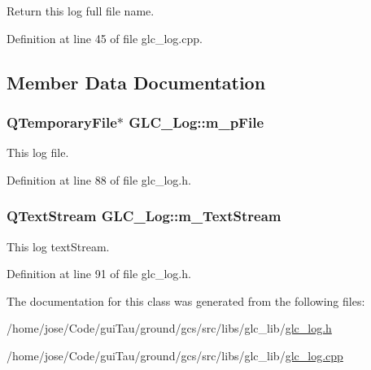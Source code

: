Return this log full file name. 



Definition at line 45 of file glc\-\_\-log.\-cpp.



\subsection{Member Data Documentation}
\hypertarget{class_g_l_c___log_a1a53b65e0ca8d561f036a6d82ddcb2a6}{
\subsubsection[{m\-\_\-p\-File}]{\setlength{\rightskip}{0pt plus 5cm}Q\-Temporary\-File$\ast$ G\-L\-C\-\_\-\-Log\-::m\-\_\-p\-File\hspace{0.3cm}{\ttfamily [protected]}}}\label{class_g_l_c___log_a1a53b65e0ca8d561f036a6d82ddcb2a6}


This log file. 



Definition at line 88 of file glc\-\_\-log.\-h.

\hypertarget{class_g_l_c___log_a8fd0fa264b69ab1ee2d68fedd370834c}{
\subsubsection[{m\-\_\-\-Text\-Stream}]{\setlength{\rightskip}{0pt plus 5cm}Q\-Text\-Stream G\-L\-C\-\_\-\-Log\-::m\-\_\-\-Text\-Stream\hspace{0.3cm}{\ttfamily [protected]}}}\label{class_g_l_c___log_a8fd0fa264b69ab1ee2d68fedd370834c}


This log text\-Stream. 



Definition at line 91 of file glc\-\_\-log.\-h.



The documentation for this class was generated from the following files\-:\begin{DoxyCompactItemize}
\item 
/home/jose/\-Code/gui\-Tau/ground/gcs/src/libs/glc\-\_\-lib/\hyperlink{glc__log_8h}{glc\-\_\-log.\-h}\item 
/home/jose/\-Code/gui\-Tau/ground/gcs/src/libs/glc\-\_\-lib/\hyperlink{glc__log_8cpp}{glc\-\_\-log.\-cpp}\end{DoxyCompactItemize}
